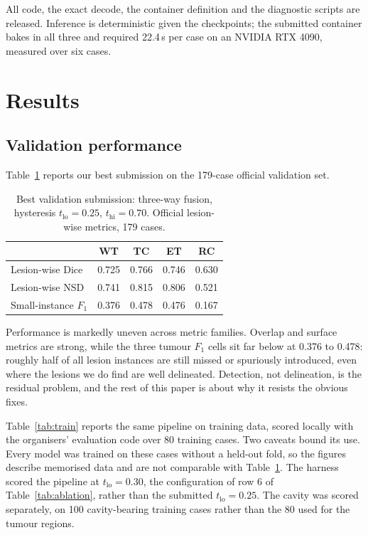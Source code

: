\documentclass[runningheads]{llncs}
\begin{document}
All code, the exact decode, the container definition and the
diagnostic scripts are released. Inference is deterministic
given the checkpoints; the submitted container bakes in all three and required 22.4\,s per case
on an NVIDIA RTX 4090, measured over six cases.

\section{Results}
\label{sec:results}

\subsection{Validation performance}

Table~\ref{tab:final} reports our best submission on the 179-case official validation set.

\begin{table}[t]
\centering
\caption{Best validation submission: three-way fusion, hysteresis $t_{\mathrm{lo}}=0.25$, $t_{\mathrm{hi}}=0.70$.
Official lesion-wise metrics, 179 cases.}
\label{tab:final}
\begin{tabular}{@{}lcccc@{}}
\toprule
 & WT & TC & ET & RC \\
\midrule
Lesion-wise Dice     & 0.725 & 0.766 & 0.746 & 0.630 \\
Lesion-wise NSD      & 0.741 & 0.815 & 0.806 & 0.521 \\
Small-instance $F_1$ & 0.376 & 0.478 & 0.476 & 0.167 \\
\bottomrule
\end{tabular}
\end{table}

Performance is markedly uneven across metric families. Overlap and surface metrics are strong,
while the three tumour $F_1$ cells sit far below at 0.376 to 0.478: roughly half of all lesion
instances are still missed or spuriously introduced, even where the lesions we do find are well
delineated. Detection, not delineation, is the residual problem, and the rest of this paper is
about why it resists the obvious fixes.

Table~\ref{tab:train} reports the same pipeline on training data, scored locally with the
organisers' evaluation code over 80 training cases. Two caveats bound its use. Every model was
trained on these cases without a held-out fold, so the figures describe memorised data and are
not comparable with Table~\ref{tab:final}. The harness scored the pipeline at
$t_{\mathrm{lo}}=0.30$, the configuration of row 6 of Table~\ref{tab:ablation}, rather than the
submitted $t_{\mathrm{lo}}=0.25$. The cavity was scored separately, on 100 cavity-bearing training
cases rather than the 80 used for the tumour regions.
\end{document}
